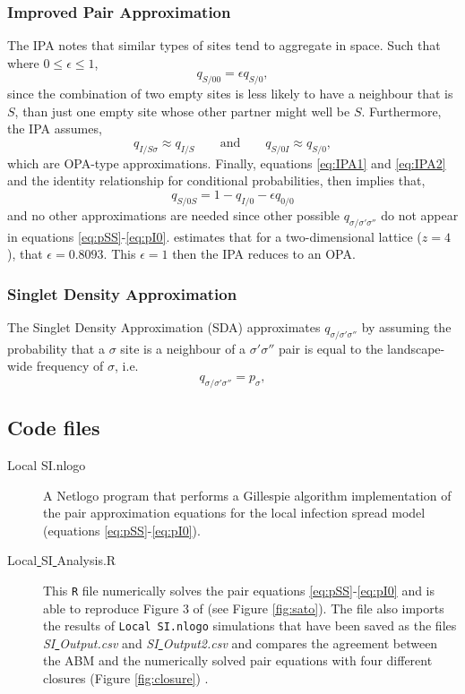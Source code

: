 \documentclass[11pt, oneside]{article}   	%
\begin{document}
\subsubsection{Improved Pair Approximation}
The IPA notes that similar types of sites tend to aggregate in space. Such that where $0 \leq \epsilon \leq 1$,
%
\begin{equation}
q_{S/00} = \epsilon q_{S/0}, \label{eq:IPA1}
\end{equation}
%
since the combination of two empty sites is less likely to have a neighbour that is $S$, than just one empty site whose other partner might well be $S$. Furthermore, the IPA assumes,
%
\begin{equation}
q_{I/S\sigma}  \approx q_{I/S}\qquad \mbox{and} \qquad q_{S/0I} \approx q_{S/0}, \label{eq:IPA2}
\end{equation}
%
which are OPA-type approximations. Finally, equations \ref{eq:IPA1} and \ref{eq:IPA2} and the identity relationship for conditional probabilities, then implies that,
%
\begin{equation}
q_{S/0S} = 1 - q_{I/0} - \epsilon q_{0/0}\label{eq:IPA3}
\end{equation}
%
and no other approximations are needed since other possible $q_{\sigma/\sigma'\sigma''}$ do not appear in equations \ref{eq:pSS}-\ref{eq:pI0}. \cite{sato} estimates that for a two-dimensional lattice ($z=4$), that $\epsilon = 0.8093$. This $\epsilon = 1$ then the IPA reduces to an OPA.

\subsubsection{Singlet Density Approximation}
The Singlet Density Approximation (SDA) approximates $q_{\sigma / \sigma' \sigma''}$ by assuming the probability that a $\sigma$ site is a neighbour of a $\sigma'\sigma''$ pair is equal to the landscape-wide frequency of $\sigma$, i.e.
%
\begin{equation}
q_{\sigma / \sigma' \sigma''} = p_\sigma,
\end{equation}
%

\subsection{Code files}
\begin{description}
\item[Local SI.nlogo] A Netlogo program that performs a Gillespie algorithm implementation of the pair approximation equations for the local infection spread model (equations \ref{eq:pSS}-\ref{eq:pI0}).
\item[Local\underline{ }SI\underline{ }Analysis.R] This \texttt{R} file numerically solves the pair equations \ref{eq:pSS}-\ref{eq:pI0} and is able to reproduce Figure 3 of \cite{sato} (see Figure \ref{fig:sato}). The file also imports the results of \texttt{Local SI.nlogo} simulations that have been saved as the files \emph{SI\underline{ }Output.csv} and \emph{SI\underline{ }Output2.csv} and compares the agreement between the ABM and the numerically solved pair equations with four different closures (Figure \ref{fig:closure}) .
\end{description}
\end{document}
